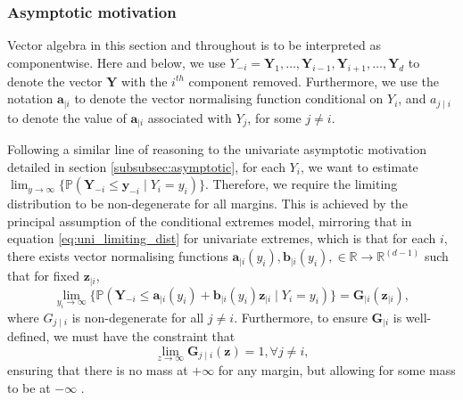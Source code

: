 \documentclass{article}
\numberwithin{equation}{section}
\begin{document}
\subsubsection{Asymptotic motivation}

Vector algebra in this section and throughout is to be interpreted as componentwise.
Here and below, we use $Y_{-i} = {\bm{Y}_1, \ldots, \bm{Y}_{i-1}, \bm{Y}_{i+1}, \ldots, \bm{Y}_d}$ to denote the vector $\bm{Y}$ with the $i^{th}$ component removed. 
Furthermore, we use the notation $\bm{a}_{\mid i}$ to denote the vector normalising function conditional on $Y_i$, and $a_{j \mid i}$ to denote the value of $\bm{a}_{\mid i}$ associated with $Y_j$, for some $j \ne i$. 

Following a similar line of reasoning to the univariate asymptotic motivation detailed in section \ref{subsubsec:asymptotic}, for each $Y_i$, we want to estimate $\lim_{y \to \infty}\{\mathbb{P}(\bm{Y}_{-i} \le \bm{y}_{-i} \mid Y_i = y_i)\}$. 
Therefore, we require the limiting distribution to be non-degenerate for all margins.
This is achieved by the principal assumption of the conditional extremes model, mirroring that in equation \ref{eq:uni_limiting_dist} for univariate extremes, which is that for each $i$, there exists vector normalising functions $\bm{a}_{\mid i}(y_i),\bm{b}_{\mid i}(y_i), \in \mathbb{R} \rightarrow \mathbb{R}^{(d-1)}$ such that for fixed $\bm{z}_{\mid i}$,
\begin{equation} \label{eq:ce_limiting_dist}
      \lim_{y_i \rightarrow \infty}\{\mathbb{P}(\bm{Y}_{-i} \le \bm{a}_{\mid i}(y_i) + \bm{b}_{\mid i}(y_i)\bm{z}_{\mid i} \mid Y_i = y_i)\} = \bm{G}_{\mid i}(\bm{z}_{\mid i}),
\end{equation}
where $G_{j \mid i}$ is non-degenerate for all $j \ne i$. 
Furthermore, to ensure $\bm{G}_{\mid i}$ is well-defined, we must have the constraint that 
\[
  \lim_{z \rightarrow \infty}{\bm{G}_{j \mid i}(\bm{z})} = 1, \forall j \ne i,
\]
ensuring that there is no mass at $+\infty$ for any margin, but allowing for some mass to be at $-\infty$ \cite{Keef2013}. 
\end{document}
